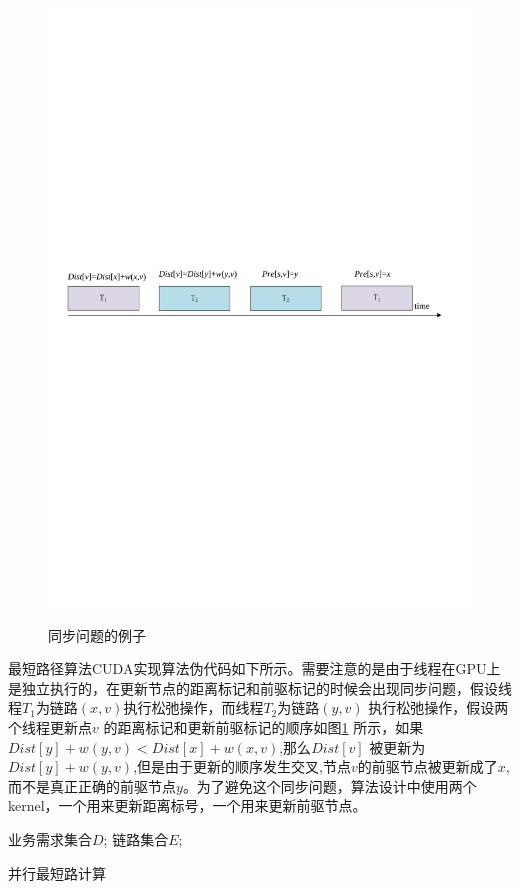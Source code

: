 \begin{figure}
\setlength{\belowcaptionskip}{-0.1cm}
\begin{center}
{\includegraphics[width=0.8 \textwidth]{figures/SynPro.pdf}}
\end{center}
\caption{{\footnotesize{同步问题的例子}}}
\label{SynPro}
\end{figure}
最短路径算法CUDA实现算法伪代码如下所示。需要注意的是由于线程在GPU上是独立执行的，在更新节点的距离标记和前驱标记的时候会出现同步问题，假设线程$T_1$为链路$(x,v)$执行松弛操作，而线程$T_2$为链路$(y,v)$ 执行松弛操作，假设两个线程更新点$v$ 的距离标记和更新前驱标记的顺序如图\ref{SynPro} 所示，如果$Dist[y] + w(y, v) < Dist[x] +w(x, v)$,那么$Dist[v]$ 被更新为$Dist[y] + w(y, v)$,但是由于更新的顺序发生交叉,节点$v$的前驱节点被更新成了$x$, 而不是真正正确的前驱节点$y$。为了避免这个同步问题，算法设计中使用两个kernel，一个用来更新距离标号，一个用来更新前驱节点。
\begin{algorithm}[t]
\begin{algorithmic}[1]
\Require
业务需求集合$D$;
链路集合$E$;
\EndWhile
{}
\end{algorithmic}
\caption{{并行最短路计算}}
\label{ParaSPC}
\end{algorithm}

